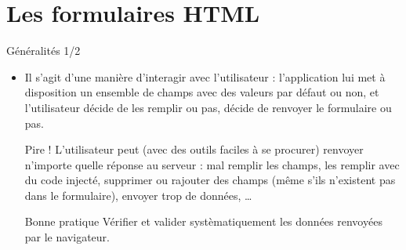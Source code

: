 
\section{Les formulaires HTML}

\begin{frame}[containsverbatim]{Généralités 1/2}
	\begin{itemize}
		\item Il s’agit d’une manière d’interagir avec l’utilisateur : l’application lui met à disposition un ensemble de champs avec des valeurs par défaut ou non, et l’utilisateur décide de les remplir ou pas, décide de renvoyer le formulaire ou pas.
		\begin{alertblock}{Pire !}
			L’utilisateur peut (avec des outils faciles à se procurer) renvoyer n’importe quelle réponse au serveur : mal remplir les champs, les remplir avec du code injecté, supprimer ou rajouter des champs (même s’ils n’existent pas dans le formulaire), envoyer trop de données, \ldots
		\end{alertblock}
		\begin{block}{Bonne pratique}
			Vérifier et valider systèmatiquement les données renvoyées par le navigateur.
		\end{block}
	\end{itemize}
\end{frame}

